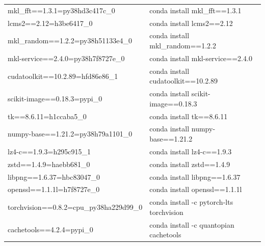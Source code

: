 \begin{table}
\begin{tabular}{ |p{8cm}||p{8cm}|  }
  mkl\_fft==1.3.1=py38hd3c417c\_0&	conda install mkl\_fft==1.3.1\\



  lcms2==2.12=h3be6417\_0&	conda install lcms2==2.12\\



  mkl\_random==1.2.2=py38h51133e4\_0&	conda install mkl\_random==1.2.2\\



  mkl-service==2.4.0=py38h7f8727e\_0&	conda install mkl-service==2.4.0\\



  cudatoolkit==10.2.89=hfd86e86\_1&	conda install cudatoolkit==10.2.89\\



  scikit-image==0.18.3=pypi\_0&	conda install scikit-image==0.18.3\\



  tk==8.6.11=h1ccaba5\_0&	conda install tk==8.6.11\\



  numpy-base==1.21.2=py38h79a1101\_0&	conda install numpy-base==1.21.2\\



  lz4-c==1.9.3=h295c915\_1&	conda install lz4-c==1.9.3\\




   zstd==1.4.9=haebb681\_0&	conda install zstd==1.4.9\\



   libpng==1.6.37=hbc83047\_0&	conda install libpng==1.6.37\\



   openssl==1.1.1l=h7f8727e\_0&	conda install openssl==1.1.1l\\



 torchvision==0.8.2=cpu\_py38ha229d99\_0&	conda install -c pytorch-lts torchvision\\




  cachetools==4.2.4=pypi\_0&	conda install -c quantopian cachetools\\




\end{tabular}
\end{table}
